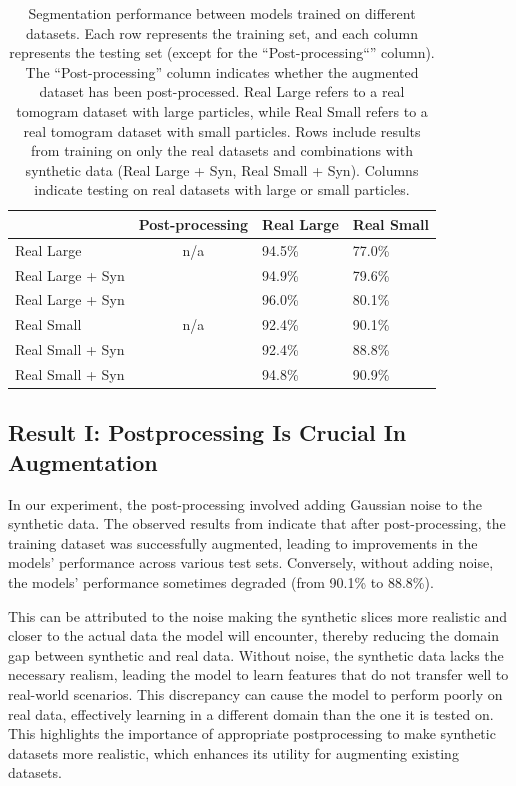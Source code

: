 \documentclass[preprint,12pt]{elsarticle}
\newcommand{\cmark}{\ding{51}}%
\newcommand{\xmark}{\ding{55}}%
\begin{document}
\begin{table}[]
    \center
    \begin{tabular}{|l|c|l|l|}
        \hline
                               & Post-processing & Real Large & Real Small \\ \hline
        Real Large             & n/a    & 94.5\%     & 77.0\%     \\ \hline
        Real Large + Syn       & \xmark & 94.9\%     & 79.6\%     \\ \hline
        Real Large + Syn       & \cmark & 96.0\%     & 80.1\%     \\ \hline \hline
        Real Small             & n/a    & 92.4\%     & 90.1\%     \\ \hline
        Real Small + Syn       & \xmark & 92.4\%     & 88.8\%     \\ \hline
        Real Small + Syn       & \cmark & 94.8\%     & 90.9\%     \\ \hline
    \end{tabular}
    \caption{Segmentation performance between models trained on different datasets. 
    Each row represents the training set, and each column represents the testing set (except for the ``Post-processing``'' column). 
    The ``Post-processing'' column indicates whether the augmented dataset has been post-processed.
    Real Large refers to a real tomogram dataset with large particles, while Real Small refers to a real tomogram dataset with small particles. 
    Rows include results from training on only the real datasets and combinations with synthetic data (Real Large + Syn, Real Small + Syn). 
    Columns indicate testing on real datasets with large or small particles.
    }
    \label{tab:res1}
\end{table}
\subsection{Result I: Postprocessing Is Crucial In Augmentation}
In our experiment, the post-processing involved adding Gaussian noise to the synthetic data. 
The observed results from  indicate that after post-processing, the training dataset was successfully augmented, leading to improvements in the models' performance across various test sets. 
Conversely, without adding noise, the models' performance sometimes degraded (from 90.1\% to 88.8\%).
\par
This can be attributed to the noise making the synthetic slices more realistic and closer to the actual data the model will encounter, thereby reducing the domain gap between synthetic and real data.
Without noise, the synthetic data lacks the necessary realism, leading the model to learn features that do not transfer well to real-world scenarios.
This discrepancy can cause the model to perform poorly on real data, effectively learning in a different domain than the one it is tested on. This highlights the importance of appropriate postprocessing to make synthetic datasets more realistic, which enhances its utility for augmenting existing datasets.
\end{document}
